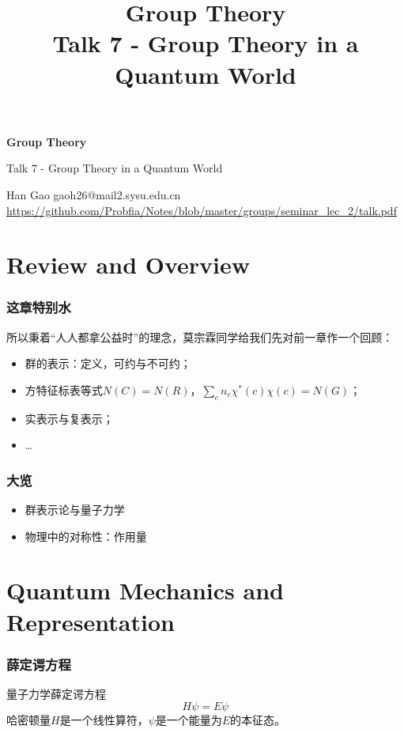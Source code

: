\documentclass[CJK]{beamer}
\title{Group Theory\\ Talk 7 - Group Theory in a Quantum World}
\author{}
\date{}
\begin{document}
\begin{frame}
 
\begin{center}
\begin{Large}
\bch
{\bf Group Theory}

{\vskip 0.3in}

Talk 7 - Group Theory in a Quantum World

\ech
\end{Large}
\end{center}

\vskip 0.2in
\begin{center}
Han Gao
\vskip 0.1in
gaoh26@mail2.sysu.edu.cn
\vskip 0.2in
{\tiny \url{https://github.com/Probfia/Notes/blob/master/groups/seminar_lec_2/talk.pdf} }\\
\end{center}


\end{frame}

\section{Review and Overview}
\begin{frame}
\frametitle{\bch 这章特别水 \ech}
\bch
所以秉着“人人都拿公益时”的理念，莫宗霖同学给我们先对前一章作一个回顾：
\begin{itemize}
\item 群的表示：定义，可约与不可约；
\item 方特征标表等式$N(C) = N(R)$，$\sum_c n_c \chi^* (c) \chi(c) = N(G)$；
\item 实表示与复表示；
\item \dots
\end{itemize}
\ech
\end{frame}

\begin{frame}
\frametitle{\bch 大览 \ech}
\bch
\begin{itemize}
\item 群表示论与量子力学
\item 物理中的对称性：作用量
\end{itemize}
\ech
\end{frame}



\section{Quantum Mechanics and Representation}
\begin{frame}

\frametitle{\bch 薛定谔方程 \ech}
\bch
量子力学薛定谔方程
$$
H \psi = E \psi
$$
哈密顿量$H$是一个线性算符，$\psi$是一个能量为$E$的本征态。
\ech
\end{frame}
\end{document}
